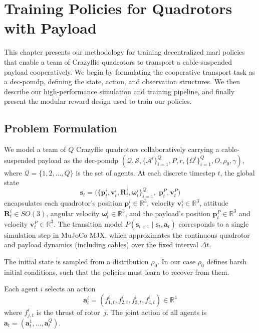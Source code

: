 \chapter{Training  Policies for Quadrotors with Payload}

This chapter presents our methodology for training decentralized \gls{marl} policies that enable a team of Crazyflie quadrotors to transport a cable-suspended payload cooperatively. We begin by formulating the cooperative transport task as a \gls{dec-pomdp}, defining the state, action, and observation structures. We then describe our high-performance simulation and training pipeline, and finally present the modular reward design used to train our policies.
\section{Problem Formulation}

We model a team of $Q$ Crazyflie quadrotors collaboratively carrying a cable-suspended payload as the \gls{dec-pomdp} $(\mathcal{Q}, \mathcal{S}, \{\mathcal{A}^i\}_{i=1}^Q, P, r, \{\Omega^i\}_{i=1}^Q, O, \rho_0, \gamma)$, where $\mathcal{Q} = \{1,2,\dots,Q\}$ is the set of agents. At each discrete timestep $t$, the global state 
\begin{equation}
\mathbf{s}_t = \bigl(\{\mathbf{p}^i_t,\mathbf{v}^i_t,\mathbf{R}^i_t,\boldsymbol{\omega}^i_t\}_{i=1}^Q,\; \mathbf{p}^P_t,\mathbf{v}^P_t\bigr)
\end{equation}
encapsulates each quadrotor's position $\mathbf{p}^i_t \in \mathbb{R}^3$, velocity $\mathbf{v}^i_t \in \mathbb{R}^3$, attitude $\mathbf{R}^i_t \in SO(3)$, angular velocity $\boldsymbol{\omega}^i_t \in \mathbb{R}^3$, and the payload's position $\mathbf{p}^P_t \in \mathbb{R}^3$ and velocity $\mathbf{v}^P_t \in \mathbb{R}^3$. The transition model $P(\mathbf{s}_{t+1}\mid \mathbf{s}_t, \mathbf{a}_t)$ corresponds to a single simulation step in MuJoCo MJX, which approximates the continuous quadrotor and payload dynamics (including cables) over the fixed interval $\Delta t$.

The initial state is sampled from a distribution $\rho_0$. In our case $\rho_0$ defines harsh initial conditions, such that the policies must learn to recover from them.

Each agent $i$ selects an action 
\begin{equation}
  \mathbf{a}^i_t = (f^i_{1,t},f^i_{2,t},f^i_{3,t},f^i_{4,t}) \in \mathbb{R}^4
\end{equation}
where $f^i_{j,t}$ is the thrust of rotor~$j$. The joint action of all agents is $\mathbf{a}_t = (\mathbf{a}^1_t,\dots,\mathbf{a}^Q_t)$. 

